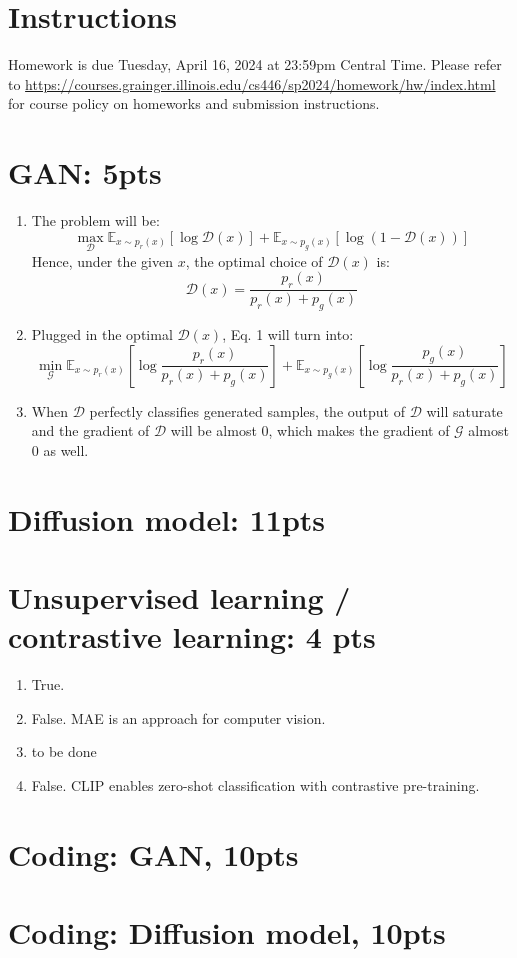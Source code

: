\documentclass[12pt]{article}
\begin{document}
\singlespacing

\renewcommand{\familydefault}{\rmdefault}


\section{Instructions}

Homework is due Tuesday, April 16, 2024 at 23:59pm Central Time.
Please refer to \url{https://courses.grainger.illinois.edu/cs446/sp2024/homework/hw/index.html} for course policy on homeworks and submission instructions.

\section{GAN: 5pts}
\begin{enumerate}
    \item The problem will be:
    \[\max_{\mathcal{D}}\mathbb{E}_{x \sim p_r(x)}[\log\mathcal{D}(x)] + \mathbb{E}_{x \sim p_g(x)}[\log(1-\mathcal{D}(x))] \]
    Hence, under the given $x$, the optimal choice of $\mathcal{D}(x)$ is:
    \[\mathcal{D}(x) = \frac{p_r(x)}{p_r(x) + p_g(x)}\]

    \item Plugged in the optimal $\mathcal{D}(x)$, Eq. 1 will turn into:
    \[\min_{\mathcal{G}}\mathbb{E}_{x \sim p_r(x)}\left[\log\frac{p_r(x)}{p_r(x) + p_g(x)}\right] + \mathbb{E}_{x \sim p_g(x)}\left[\log\frac{p_g(x)}{p_r(x) + p_g(x)}\right]\]

    \item When $\mathcal{D}$ perfectly classifies generated samples, the output of $\mathcal{D}$ will saturate and the gradient of $\mathcal{D}$ will be almost 0, which makes the gradient of $\mathcal{G}$ almost 0 as well.
\end{enumerate}
\newpage

\section{Diffusion model: 11pts}

\newpage

\section{Unsupervised learning / contrastive learning: 4 pts}
\begin{enumerate}
    \item True.
    \item False. MAE is an approach for computer vision.
    \item to be done 
    \item False. CLIP enables zero-shot classification with contrastive pre-training.
\end{enumerate}
\newpage

\section{Coding: GAN, 10pts}

\newpage

\section{Coding: Diffusion model, 10pts}
\end{document}
